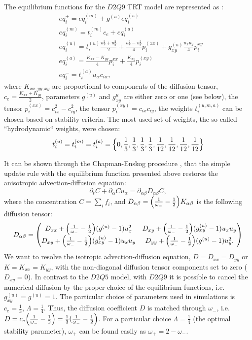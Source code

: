\documentclass{article}
\newcommand{\beq}{\begin{equation}}
\newcommand{\feq}{\end{equation}}
\newcommand{\omegaplus}{\omega_{+}}
\newcommand{\omegaminus}{\omega_{-}}
\begin{document}
The equilibrium functions for the $D2Q9$ TRT model are represented as \cite{kuzmin-stability-optimal}:
\begin{equation}
\begin{aligned}
&eq_i^{+}=eq_i^{(m)}+g^{(u)} eq_i^{(u)}\\
&eq_i^{(m)}=t_i^{(m)} c_e+ eq_i^{(a)}\\
&eq_i^{(u)}=t_i^{(u)} \frac{u_x^2+u_y^2}{2}+\frac{u_x^2-u_y^2}{4} p_i^{(xx)}+g_{xy}^{(u)}\frac{u_x
u_y}{4} p_i^{xy}\\
&eq_i^{(a)}=\frac{K_{xx}-K_{yy}}{4} p_i^{xx}+\frac{K_{xy}}{4} p_i^{(xy)}\\
&eq_i^{-}=t_i^{(a)}  u_{\alpha} c_{i\alpha},
\end{aligned}
\end{equation}
where $K_{xx,yy,xy}$ are proportional to components of the diffusion tensor,
$c_e=\frac{K_{xx}+K_{yy}}{2}$, parameters $g^{(u)}$ and $g^{u}_{xy}$ are either zero or one (see
below), the tensor $p_i^{(xx)}=c_{ix}^2-c_{iy}^2$, the tensor $p_i^{(xy)}=c_{ix} c_{iy}$, the
weights
$t_i^{(u,m,a)}$ can be chosen based on stability criteria. The most used set of weights, the so-called
``hydrodynamic`` weights, were chosen:
\begin{equation}
t_i^{(u)}=t_i^{(m)}=t_i^{(a)}=\Bigl\{0,\frac{1}{3},\frac{1}{3},\frac{1}{3},\frac{1}{3},\frac{1}{12},
\frac {1}{12},\frac{1}{12},\frac{1}{12}\Bigr\}
\end{equation}
 
It can be shown through the Chapman-Enskog procedure \cite{chapman}, that the simple update rule
with the equilibrium function presented above restores the anisotropic
advection-diffusion equation:
\beq
\partial_t C+ \partial_{\alpha} C u_{\alpha}=\partial_{\alpha\beta} D_{\alpha\beta} C,
\feq
where the concentration $C=\sum_i{f_i}$, and $D_{\alpha\beta}=\Bigl(\frac{1}{\omegaminus}-\frac{1}{2}\Bigr)K_{\alpha\beta}$ is the
following diffusion tensor:
\begin{equation}
D_{\alpha\beta}=
\begin{pmatrix}
D_{xx} + \Bigl(\frac{1}{\omegaminus}-\frac{1}{2}\Bigr)(g^{(u)}-1) u_x^2 &
D_{xy}+\Bigl(\frac{1}{\omegaminus}-\frac{1}{2}\Bigr)(g_{xy}^{(u)}-1)u_x u_y\\
D_{xy} + \Bigl(\frac{1}{\omegaminus}-\frac{1}{2}\Bigr)(g_{xy}^{(u)}-1) u_x u_y&
D_{yy}+\Bigl(\frac{1}{\omegaminus}-\frac{1}{2}\Bigr)(g^{(u)}-1) u_y^2. 
\end{pmatrix}
\end{equation}
We want to resolve the isotropic advection-diffusion equation, $D=D_{xx}=D_{yy}$ or
$K=K_{xx}=K_{yy}$, with the non-diagonal diffusion tensor components set to zero ($D_{xy}=0$). In
contrast to the $D2Q5$ model, with $D2Q9$ it is
possible to cancel the numerical diffusion by the proper choice
of the equilibrium functions, i.e. $g_{xy}^{(u)}=g^{(u)}=1$.  The particular choice of parameters
used in simulations is $c_e=\frac{1}{3}$, $\Lambda=\frac{1}{4}$. Thus, the diffusion coefficient $D$
is matched through $\omegaminus$, i.e. $D=c_e
\Bigl(\frac{1}{\omegaminus}-\frac{1}{2}\Bigr)=\frac{1}{3}(\frac{1}{\omegaminus}-\frac{1}{2}\Bigr)$.
For a particular choice $\Lambda=\frac{1}{4}$ (the optimal stability parameter), $\omegaplus$ can be found easily as
 $\omegaplus=2-\omegaminus$.  
\end{document}
